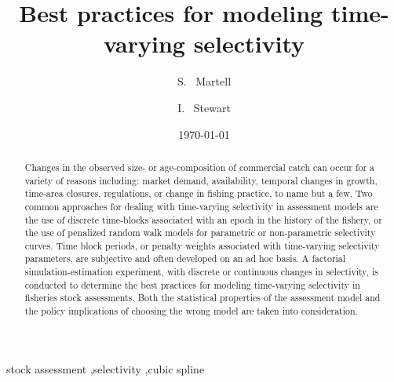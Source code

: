 \documentclass[5p,twocolumn,letterpaper,10pt,authoryear,times]{elsarticle}
\title{Best practices for modeling time-varying selectivity}
\author[sm]{S. ~Martell\corref{cor1}}
\author[is]{I. ~Stewart}
\date{\today}
\begin{document}


	
	
	
	\begin{abstract}

    Changes in the observed size- or age-composition of commercial catch can occur for a variety of reasons including: market demand, availability, temporal changes in growth, time-area closures, regulations, or change in fishing practice, to name but a few.  Two common approaches for dealing with time-varying selectivity in assessment models are the use of discrete time-blocks associated with an epoch in the history of the fishery, or the use of penalized random walk models for parametric or non-parametric selectivity curves.  Time block periods, or penalty weights associated with time-varying selectivity parameters, are subjective and often developed on an ad hoc basis. A factorial simulation-estimation experiment, with discrete or continuous changes in selectivity, is conducted to determine the best practices for modeling time-varying selectivity in fisheries stock assessments. Both the statistical properties of the assessment model and the policy implications of choosing the wrong model are taken into consideration.

	\end{abstract}
	\begin{keyword}
		stock assessment \sep selectivity \sep cubic spline		
	\end{keyword}


	\maketitle
	
	
	
	
	


	
	
	
\end{document}
